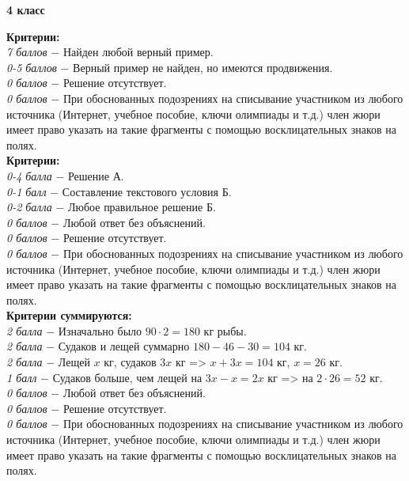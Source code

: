 \centerline{\bf \Huge 4 класс}

 \textbf{Критерии:} \\
\textit{7 баллов} $-$ Найден любой верный пример.\\
\textit{0-5 баллов} $-$ Верный пример не найден, но имеются продвижения.\\
\textit{0 баллов} $-$ Решение отсутствует.\\
\textit{0 баллов} $-$ При обоснованных подозрениях на списывание участником из любого источника (Интернет, учебное пособие, ключи олимпиады и т.д.) член жюри имеет право указать на такие фрагменты с помощью восклицательных знаков на полях. \\

 \textbf{Критерии:} \\
\textit{0-4 балла} $-$ Решение А.\\
\textit{0-1 балл} $-$ Составление текстового условия Б.\\
\textit{0-2 балла} $-$ Любое правильное решение Б.\\
\textit{0 баллов} $-$ Любой ответ без объяснений.\\
\textit{0 баллов} $-$ Решение отсутствует.\\
\textit{0 баллов} $-$ При обоснованных подозрениях на списывание участником из любого источника (Интернет, учебное пособие, ключи олимпиады и т.д.) член жюри имеет право указать на такие фрагменты с помощью восклицательных знаков на полях. \\


 \textbf{Критерии суммируются:} \\
\textit{2 балла} $-$ Изначально было $90\cdot2=180$ кг рыбы.\\
\textit{2 балла} $-$ Судаков и лещей суммарно $180-46-30=104$ кг.\\
\textit{2 балла} $-$ Лещей $x$ кг, судаков $3x$ кг => $x+3x=104$ кг, $x=26$ кг.\\
\textit{1 балл} $-$ Судаков больше, чем лещей на $3x-x=2x$ кг => на $2\cdot26=52$ кг.\\
\textit{0 баллов} $-$ Любой ответ без объяснений.\\
\textit{0 баллов} $-$ Решение отсутствует.\\
\textit{0 баллов} $-$ При обоснованных подозрениях на списывание участником из любого источника (Интернет, учебное пособие, ключи олимпиады и т.д.) член жюри имеет право указать на такие фрагменты с помощью восклицательных знаков на полях. \\

